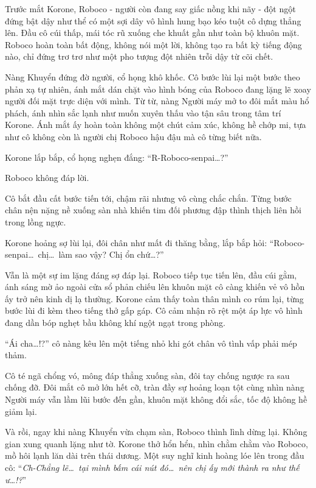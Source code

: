 \documentclass[../main.tex]{subfiles}
\begin{document}
Trước mắt Korone, Roboco - người còn đang say giấc nồng khi nãy - đột ngột đứng bật dậy như thể có một sợi dây vô hình hung bạo kéo tuột cô dựng thẳng lên. Đầu cô cúi thấp, mái tóc rũ xuống che khuất gần như toàn bộ khuôn mặt. Roboco hoàn toàn bất động, không nói một lời, không tạo ra bất kỳ tiếng động nào, chỉ đứng trơ trơ như một pho tượng đột nhiên trỗi dậy từ cõi chết.

Nàng Khuyển đứng đờ người, cổ họng khô khốc. Cô bước lùi lại một bước theo phản xạ tự nhiên, ánh mắt dán chặt vào hình bóng của Roboco đang lặng lẽ xoay người đối mặt trực diện với mình. Từ từ, nàng Người máy mở to đôi mắt màu hổ phách, ánh nhìn sắc lạnh như muốn xuyên thấu vào tận sâu trong tâm trí Korone. Ánh mắt ấy hoàn toàn không một chút cảm xúc, không hề chớp mi, tựa như cô không còn là người chị Roboco hậu đậu mà cô từng biết nữa.

Korone lắp bắp, cổ họng nghẹn đắng: ``R-Roboco-senpai\dots?''

Roboco không đáp lời.

Cô bắt đầu cất bước tiến tới, chậm rãi nhưng vô cùng chắc chắn. Từng bước chân nện nặng nề xuống sàn nhà khiến tim đối phương đập thình thịch liên hồi trong lồng ngực.

Korone hoảng sợ lùi lại, đôi chân như mất đi thăng bằng, lắp bắp hỏi: ``Roboco-senpai\dots\ chị\dots\ làm sao vậy? Chị ổn chứ\dots?''

Vẫn là một sự im lặng đáng sợ đáp lại. Roboco tiếp tục tiến lên, đầu cúi gằm, ánh sáng mờ ảo ngoài cửa sổ phản chiếu lên khuôn mặt cô càng khiến vẻ vô hồn ấy trở nên kinh dị lạ thường. Korone cảm thấy toàn thân mình co rúm lại, từng bước lùi đi kèm theo tiếng thở gấp gáp. Cô cảm nhận rõ rệt một áp lực vô hình đang dần bóp nghẹt bầu không khí ngột ngạt trong phòng.

``Ái cha\dots!?'' cô nàng kêu lên một tiếng nhỏ khi gót chân vô tình vấp phải mép thảm.

Cô té ngã chổng vó, mông đáp thẳng xuống sàn, đôi tay chống ngược ra sau chống đỡ. Đôi mắt cô mở lớn hết cỡ, tràn đầy sự hoảng loạn tột cùng nhìn nàng Người máy vẫn lầm lũi bước đến gần, khuôn mặt không đổi sắc, tốc độ không hề giảm lại.

Và rồi, ngay khi nàng Khuyển vừa chạm sàn, Roboco thình lình dừng lại. Không gian xung quanh lặng như tờ. Korone thở hổn hển, nhìn chằm chằm vào Roboco, mồ hôi lạnh lăn dài trên thái dương. Một suy nghĩ kinh hoàng lóe lên trong đầu cô: ``\textit{Ch-Chẳng lẽ\dots\ tại mình bấm cái nút đó\dots\ nên chị ấy mới thành ra như thế ư\dots!?}''
\end{document}
